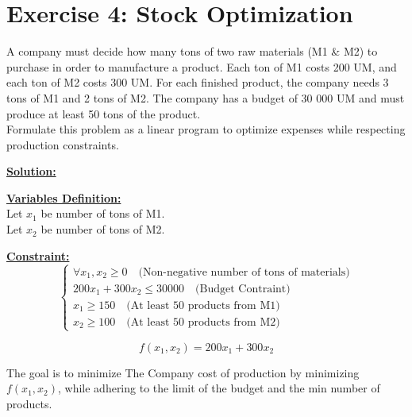 \section*{Exercise 4: Stock Optimization}

A company must decide how many tons of two raw materials (M1 \& M2) to purchase in order to manufacture a product. 
Each ton of M1 costs 200 UM, and each ton of M2 costs 300 UM. For each finished product, the company needs 3 tons of M1 
and 2 tons of M2. The company has a budget of 30 000 UM and must produce at least 50 tons of the product.\\
Formulate this problem as a linear program to optimize expenses while respecting production constraints.

\vspace{1.5cm}
\textbf{\underline{\Large Solution:}}

\vspace{0.5cm}
\begin{minipage}[t]{0.45\textwidth}
    \textbf{\underline{Variables Definition:}} \\[1em] %

    Let \(x_1\) be number of tons of M1. \\
   
    Let \(x_2\) be number of tons of M2.
\end{minipage}%
\hfill %
\begin{minipage}[t]{0.45\textwidth}
    \textbf{\underline{Constraint:}} \\[1em]
    \[
    \left\{
        \begin{array}{l}
            \forall x_1, x_2 \geq 0 \quad \text{(Non-negative number of tons of materials)}\\
            200x_1 + 300x_2  \leq 30 000 \quad \text{(Budget Contraint)}\\
            x_1 \geq 150 \quad \text{(At least 50 products from M1)}\\
            x_2 \geq 100 \quad \text{(At least 50 products from M2)}
        \end{array}
    \right.
    \]
\end{minipage}
\vspace{0.5cm}
\begin{tcolorbox}[title = Objectif Function]
\[
f(x_1,x_2) = 200x_1 + 300x_2 
\]
\begin{center}
The goal is to minimize The Company cost of production by minimizing \(f(x_1,x_2)\), while adhering to the limit of the budget and the min number of products.
\end{center}
\end{tcolorbox}

